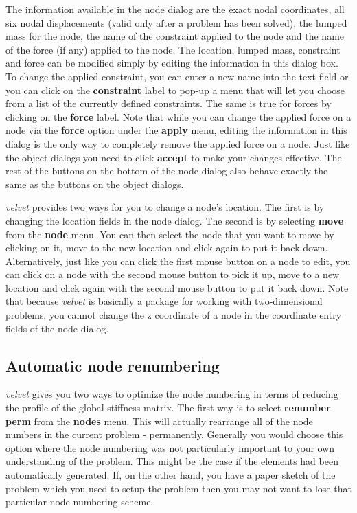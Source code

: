 The information available in the node dialog are the exact nodal
coordinates, all six nodal displacements (valid only after a problem
has been solved), the lumped mass for the node, the name of the 
constraint applied to the node
and the name of the force (if any) applied to the node.  The location,
lumped mass, constraint and force can be modified simply by editing the 
information in this dialog box. To change the applied constraint, you
can enter a new name into the text field or you can click on the 
{\bf constraint} label to pop-up a menu that will
let you choose from a list of the currently defined constraints.  The same
is true for forces by clicking on the {\bf force} label.  Note that while
you can change the applied force on a node via the {\bf force} option under the 
{\bf apply} menu, editing the information in this dialog is the only way to
completely remove the applied force on a node.  Just like the 
object dialogs you need to click {\bf accept} to make your changes
effective.  The rest of the buttons on the bottom of the node dialog also
behave exactly the same as the buttons on the object dialogs.  

{\em velvet} provides two ways for you to change a node's location.  The
first is by changing the location fields in the node dialog.  The second
is by selecting {\bf move} from the {\bf node} menu.  You can then select
the node that you want to move by clicking on it, move to the new location
and click again to put it back down.  Alternatively, just like you can click
the first mouse button on a node to edit, you can click
on a node with the second mouse button to pick it up, move to a new location
and click again with the second mouse button to put it back down. Note that
because {\em velvet} is basically a package for working with two-dimensional
problems, you cannot change the z coordinate of a node in the coordinate
entry fields of the node dialog.

\subsection{Automatic node renumbering}
\label{velvet.renumbering}
{\em velvet} gives you two ways to optimize the node numbering in terms
of reducing the profile of the global stiffness matrix.  The first way
is to select {\bf renumber perm} from the {\bf nodes} menu.  This will actually
rearrange all of the node numbers in the current problem - permanently.
Generally you would choose this option where the node numbering was not
particularly important to your own understanding of the problem.  This might
be the case if the elements had been automatically generated.  If, on the
other hand, you have a paper sketch of the problem which you used to
setup the problem then you may not want to lose that particular node numbering
scheme.

